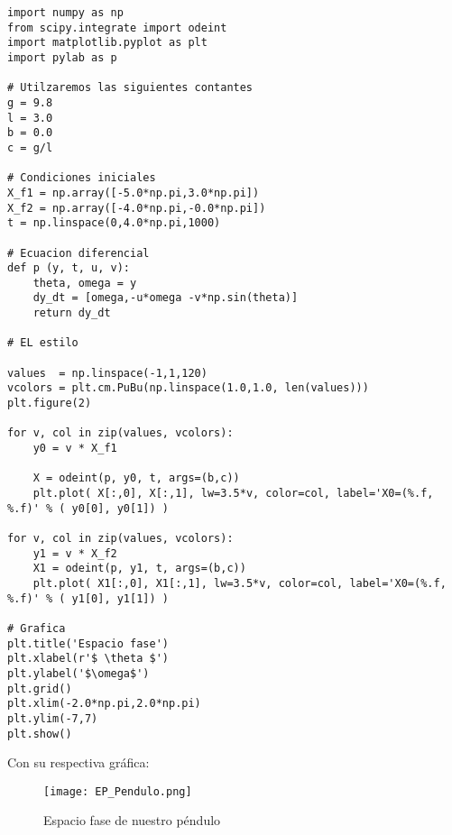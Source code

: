 \documentclass[a4 paper]{article}
\numberwithin{equation}{section}
\newcommand{\0}{\mathbf{0}}
\begin{document}
\begin{verbatim}
import numpy as np
from scipy.integrate import odeint
import matplotlib.pyplot as plt
import pylab as p

# Utilzaremos las siguientes contantes
g = 9.8
l = 3.0
b = 0.0 
c = g/l

# Condiciones iniciales
X_f1 = np.array([-5.0*np.pi,3.0*np.pi])
X_f2 = np.array([-4.0*np.pi,-0.0*np.pi]) 
t = np.linspace(0,4.0*np.pi,1000) 

# Ecuacion diferencial
def p (y, t, u, v):
    theta, omega = y
    dy_dt = [omega,-u*omega -v*np.sin(theta)]
    return dy_dt

# EL estilo

values  = np.linspace(-1,1,120)   
vcolors = plt.cm.PuBu(np.linspace(1.0,1.0, len(values)))
plt.figure(2)

for v, col in zip(values, vcolors):
    y0 = v * X_f1                              
    
    X = odeint(p, y0, t, args=(b,c))         
    plt.plot( X[:,0], X[:,1], lw=3.5*v, color=col, label='X0=(%.f, %.f)' % ( y0[0], y0[1]) )

for v, col in zip(values, vcolors):
    y1 = v * X_f2                           
    X1 = odeint(p, y1, t, args=(b,c))           
    plt.plot( X1[:,0], X1[:,1], lw=3.5*v, color=col, label='X0=(%.f, %.f)' % ( y1[0], y1[1]) )

# Grafica
plt.title('Espacio fase')
plt.xlabel(r'$ \theta $')
plt.ylabel('$\omega$')
plt.grid()
plt.xlim(-2.0*np.pi,2.0*np.pi)
plt.ylim(-7,7)
plt.show()

\end{verbatim}

Con su respectiva gr\'afica:

\begin{figure}[!ht]
  \centering
      \texttt{[image: EP\_Pendulo.png]}
  \caption{Espacio fase de nuestro p\'endulo}
\end{figure}
\end{document}

